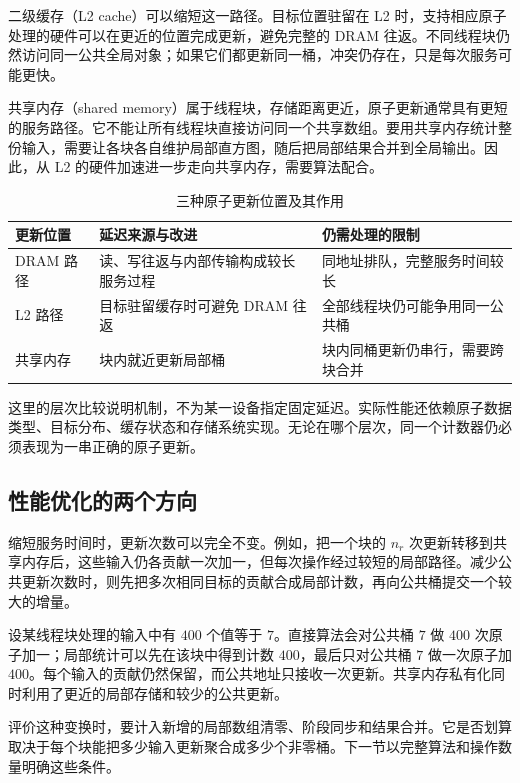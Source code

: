 二级缓存（L2 cache）可以缩短这一路径。目标位置驻留在 L2 时，支持相应原子处理的硬件可以在更近的位置完成更新，避免完整的 DRAM 往返。不同线程块仍然访问同一公共全局对象；如果它们都更新同一桶，冲突仍存在，只是每次服务可能更快。

共享内存（shared memory）属于线程块，存储距离更近，原子更新通常具有更短的服务路径。它不能让所有线程块直接访问同一个共享数组。要用共享内存统计整份输入，需要让各块各自维护局部直方图，随后把局部结果合并到全局输出。因此，从 L2 的硬件加速进一步走向共享内存，需要算法配合。

\begin{table}[htbp]
\centering
\caption{三种原子更新位置及其作用}
\label{l13:tab:memory-levels}
\small
\begin{tabularx}{\textwidth}{>{\raggedright\arraybackslash}p{2.0cm}YY}
\toprule
更新位置 & 延迟来源与改进 & 仍需处理的限制 \\
\midrule
DRAM 路径 & 读、写往返与内部传输构成较长服务过程 & 同地址排队，完整服务时间较长 \\
L2 路径 & 目标驻留缓存时可避免 DRAM 往返 & 全部线程块仍可能争用同一公共桶 \\
共享内存 & 块内就近更新局部桶 & 块内同桶更新仍串行，需要跨块合并 \\
\bottomrule
\end{tabularx}
\end{table}

这里的层次比较说明机制，不为某一设备指定固定延迟。实际性能还依赖原子数据类型、目标分布、缓存状态和存储系统实现。无论在哪个层次，同一个计数器仍必须表现为一串正确的原子更新。

\subsection{性能优化的两个方向}

缩短服务时间时，更新次数可以完全不变。例如，把一个块的 $n_r$ 次更新转移到共享内存后，这些输入仍各贡献一次加一，但每次操作经过较短的局部路径。减少公共更新次数时，则先把多次相同目标的贡献合成局部计数，再向公共桶提交一个较大的增量。

设某线程块处理的输入中有 $400$ 个值等于 $7$。直接算法会对公共桶 $7$ 做 $400$ 次原子加一；局部统计可以先在该块中得到计数 $400$，最后只对公共桶 $7$ 做一次原子加 $400$。每个输入的贡献仍然保留，而公共地址只接收一次更新。共享内存私有化同时利用了更近的局部存储和较少的公共更新。

评价这种变换时，要计入新增的局部数组清零、阶段同步和结果合并。它是否划算取决于每个块能把多少输入更新聚合成多少个非零桶。下一节以完整算法和操作数量明确这些条件。
